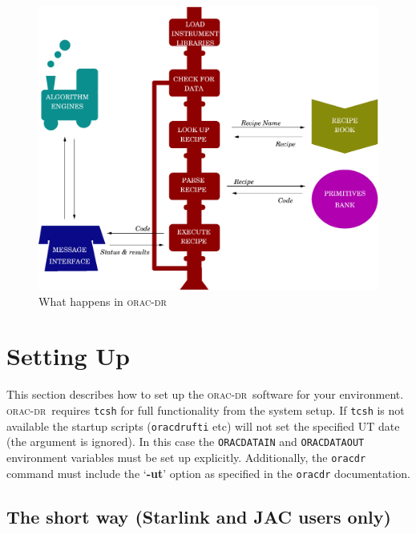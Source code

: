 \documentclass[twoside,11pt]{article}
\newcommand{\xlabel}[1]{}
\renewcommand{\_}{\texttt{\symbol{95}}}
\def\C++{{\rm C\kern-.05em\raise.3ex\hbox{\footnotesize ++}}}
\newcommand{\underscore}{\_}
\newcommand{\oracdr}{\textsc{orac-dr}}
\begin{document}
\begin{figure}
\includegraphics[width=\textwidth]{sun230_train.eps}
\caption{What happens in \oracdr}
\end{figure}




\section{Setting Up\xlabel{setting_up}}

This section describes how to set up the \oracdr\ software for your
environment. \oracdr\ requires \texttt{tcsh} for full functionality
from the system setup. If
 \texttt{tcsh} is not available the startup scripts (\texttt{oracdr\_ufti} etc)
 will not set the specified UT date (the argument is ignored). In this case
 the \texttt{ORAC\_DATA\_IN} and \texttt{ORAC\_DATA\_OUT} environment
 variables must be set up explicitly.  Additionally, the \texttt{oracdr}
 command must include the `\textbf{-ut}' option as specified in the
 \texttt{oracdr} documentation.

\subsection*{The short way (Starlink and JAC users only)}
\end{document}
